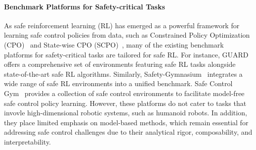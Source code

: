 \paragraph{Benchmark Platforms for Safety-critical Tasks}  

As safe reinforcement learning (RL) has emerged as a powerful framework for learning safe control policies from data, such as Constrained Policy Optimization (CPO)~\citep{achiam2017cpo} and State-wise CPO (SCPO)~\citep{zhao2023state}, many of the existing benchmark platforms for safety-critical tasks are tailored for safe RL. For instance, GUARD~\citep{zhao2023guard} offers a comprehensive set of environments featuring safe RL tasks alongside state-of-the-art safe RL algorithms. Similarly, Safety-Gymnasium~\citep{ji2023safety} integrates a wide range of safe RL environments into a unified benchmark. Safe Control Gym~\citep{yuan2022safe} provides a collection of safe control environments to facilitate model-free safe control policy learning.  
However, these platforms do not cater to tasks that invovle high-dimensional robotic systems, such as humanoid robots. In addition, they place limited emphasis on model-based methods, which remain essential for addressing safe control challenges due to their analytical rigor, composability, and interpretability.  

